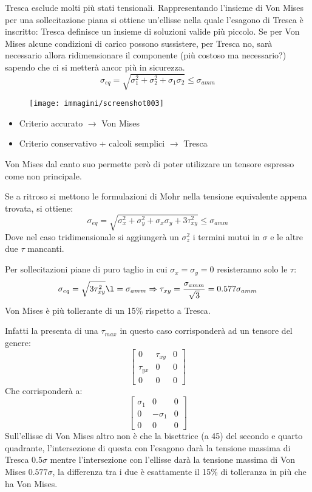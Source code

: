 \documentclass{article}
\begin{document}
\begin{adjustwidth}{2in}{}
 		Tresca esclude molti più stati tensionali. Rappresentando l'insieme di Von Mises per una sollecitazione piana si ottiene un'ellisse nella quale l'esagono di Tresca è inscritto: Tresca definisce un insieme di soluzioni valide più piccolo. Se per Von Mises alcune condizioni di carico possono sussistere, per Tresca no, sarà necessario allora ridimensionare il componente (più costoso ma necessario?) sapendo che ci si metterà ancor più in sicurezza.
 		\[\sigma_{eq} = \sqrt{\sigma_1^2 + \sigma_2^2 + \sigma_1\sigma_2 } \leq \sigma_{amm}\]
 		
 		\begin{figure}[H]
 			\centering
 			\texttt{[image: immagini/screenshot003]}
 			\label{fig:screenshot003}
 		\end{figure}
 				 
 		\begin{itemize}
 			\item Criterio accurato $\rightarrow$ Von Mises
 			\item Criterio conservativo + calcoli semplici $\rightarrow$ Tresca
 		\end{itemize}
 		Von Mises dal canto suo permette però di poter utilizzare un tensore espresso come non principale.
 		
 		Se a ritroso si mettono le formulazioni di Mohr nella tensione equivalente appena trovata, si ottiene:
 		\[\sigma_{eq} = \sqrt{\sigma_x^2 + \sigma_y^2 + \sigma_x\sigma_y +3\tau_{xy}^2} \leq \sigma_{amm}\]
 		Dove nel caso tridimensionale si aggiungerà un $\sigma_z^2$ i termini mutui in $\sigma$ e le altre due $\tau$ mancanti. \newline 
 		
 		Per sollecitazioni piane di puro taglio in cui $\sigma_x = \sigma_y = 0$ resisteranno solo le $\tau$:
 		\[\sigma_{eq} = \sqrt{3\tau_{xy}^2} \l= \sigma_{amm} \Rightarrow \tau_{xy} = {\sigma_{amm}\over\sqrt{3}} = 0.577\sigma_{amm} \]
 		Von Mises è più tollerante di un 15\% rispetto a Tresca. 
 		
 		Infatti la presenta di una $\tau_{max}$ in questo caso corrisponderà ad un tensore del genere:
 		\[\left[\begin{array}{ccc}
 			0 & \tau_{xy} & 0 \\
 			\tau_{yx} & 0 & 0 \\
 			0 & 0 & 0
 		\end{array}\right]\] 
 		Che corrisponderà a:
 		\[\left[\begin{array}{ccc}
 			\sigma_1 & 0 & 0 \\
 			0 & -\sigma_1 & 0 \\
 			0 & 0 & 0
 		\end{array}\right]\] 
 		Sull'ellisse di Von Mises altro non è che la bisettrice (a 45\degree) del secondo e quarto quadrante, l'intersezione di questa con l'esagono darà la tensione massima di Tresca $0.5\sigma$ mentre l'intersezione con l'ellisse darà la tensione massima di Von Mises $0.577\sigma$, la differenza tra i due è esattamente il 15\% di tolleranza in più che ha Von Mises. \newline 
 		

\end{adjustwidth}
\end{document}
